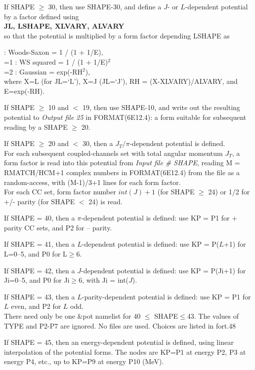 \documentclass[11pt]{article}
\begin{document}
\medskip

If SHAPE $\geq$ 30, then use SHAPE-30, and define a
$J$- or  $L$-dependent potential by a factor defined
using \\
{\bf JL, LSHAPE, XLVARY, ALVARY} \\
so that the potential is multiplied by a form factor depending LSHAPE as 

 : Woods-Saxon  = 1 / (1 + 1/E), \\
      =1 : WS squared   = 1 / (1 + 1/E)$^2$\\
      =2 : Gaussian     = exp(-RH$^2$), \\
where X=L (for JL=`L'), X=J (JL=`J'),
RH = (X-XLVARY)/ALVARY, and E=exp(-RH).

\medskip

If SHAPE $\geq$ 10 and $<$ 19, then use SHAPE-10, and write out the
resulting potential to {\em Output file 25} in FORMAT(6E12.4):
a form suitable for subsequent reading by a SHAPE $\geq$ 20.

\medskip

If SHAPE $\geq$ 20 and $<$ 30, then a $J_{T}/\pi$-dependent
potential is defined.
\\
For each subsequent coupled-channels set with total angular momentum
$J_{T}$, a form factor is read into this potential from
{\em Input file \# SHAPE}, reading M = RMATCH/HCM+1 complex numbers
in FORMAT(6E12.4) from the
file as a random-access, with (M-1)/3+1 lines for each form factor.
\\
For each CC set, form factor number
$int(J)+1$ (for SHAPE $\geq$ 24) or
1/2 for +/- parity (for SHAPE $<$ 24) is read.

If SHAPE = 40, then a $\pi$-dependent potential is defined:
use KP = P1 for + parity CC sets, and P2 for -- parity.

If SHAPE = 41, then a $L$-dependent potential is defined:
use KP = P($L$+1) for L=0--5, and P0 for L$\geq$6.

If SHAPE = 42, then a $J$-dependent potential is defined:
use KP = P(Ji+1) for Ji=0--5, and P0 for Ji$\geq$6, with Ji = int($J$).

If SHAPE = 43, then a $L$-parity-dependent potential is defined:
use KP = P1 for $L$ even, and P2 for $L$ odd.
\\
There need only be one \&pot namelist for 40 $\leq$ SHAPE$\leq$43. The values of TYPE
and P2-P7 are ignored. No files are used. Choices are listed in fort.48

If SHAPE = 45, then an energy-dependent potential is defined, using linear interpolation of the potential forms.
The nodes are KP=P1 at energy P2, P3 at energy P4, etc., up to KP=P9 at energy P10 (MeV).
\end{document}
